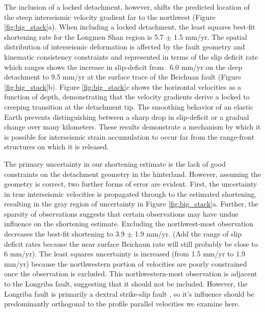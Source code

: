\documentclass[12pt]{article}
\begin{document}
The inclusion of a locked detachment, however, shifts the predicted location of the steep interseismic velocity gradient far to the northwest (Figure \ref{fig:big_stack}a). When including a locked detachment, the least squares best-fit shortening rate for the Longmen Shan region is 5.7 $\pm$ 1.5 mm/yr. The spatial distribution of interseismic deformation is affected by the fault geometry and kinematic consistency constraints and represented in terms of the slip deficit rate which ranges shows the increase in slip-deficit from ~6.0 mm/yr on the deep detachment to 9.5 mm/yr at the surface trace of the Beichuan fault (Figure \ref{fig:big_stack}b). Figure \ref{fig:big_stack}c shows the horizontal velocities as a function of depth, demonstrating that the velocity gradients derive a locked to creeping transition at the detachment tip. The smoothing behavior of an elastic Earth prevents distinguishing between a sharp drop in slip-deficit or a gradual change over many kilometers. These results demonstrate a mechanism by which it is possible for interseismic strain accumulation to occur far from the range-front structures on which it is released.

The primary uncertainty in our shortening estimate is the lack of good constraints on the detachment geometry in the hinterland. However, assuming the geometry is correct, two further forms of error are evident. First, the uncertainty in true interseismic velocities is propagated through to the estimated shortening, resulting in the gray region of uncertainty in Figure \ref{fig:big_stack}a. Further, the sparsity of observations suggests that certain observations may have undue influence on the shortening estimate. Excluding the northwest-most observation decreases the best-fit shortening to 3.9 $\pm$ 1.9 mm/yr. (Add the range of slip deficit rates because the near surface Beichaun rate will still probably be close to 6 mm/yr).  The least squares uncertainty is increased (from 1.5 mm/yr to 1.9 mm/yr) because the northwestern portion of velocities are poorly constrained once the observation is excluded. This northwestern-most observation is adjacent to the Longriba fault, suggesting that it should not be included. However, the Longriba fault is primarily a dextral strike-slip fault \citep{Ren2013}, so it's influence should be predominantly orthogonal to the profile parallel velocities we examine here.
\end{document}
